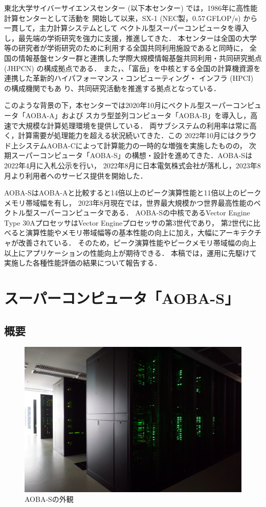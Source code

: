 ﻿\documentclass[submit,techrep,noauthor]{ipsj}
\begin{document}
東北大学サイバーサイエンスセンター (以下本センター) では，1986年に高性能計算センターとして活動を
開始して以来，SX-1 (NEC製，0.57\,GFLOP/s) から一貫して，主力計算システムとして
ベクトル型スーパーコンピュータを導入し，最先端の学術研究を強力に支援，推進してきた．
本センターは全国の大学等の研究者が学術研究のために利用する全国共同利用施設であると同時に，
全国の情報基盤センター群と連携した学際大規模情報基盤共同利用・共同研究拠点 (JHPCN) の構成拠点である．
また，、「富岳」を中核とする全国の計算機資源を連携した革新的ハイパフォーマンス・コンピューティング・
インフラ (HPCI) の構成機関でもあ り、共同研究活動を推進する拠点となっている．

このような背景の下，本センターでは2020年10月にベクトル型スーパーコンピュータ「AOBA-A」および
スカラ型並列コンピュータ「AOBA-B」を導入し，高速で大規模な計算処理環境を提供している．
両サブシステムの利用率は常に高く，計算需要が処理能力を超える状況続いてきた．この
2022年10月にはクラウド上システムAOBA-Cによって計算能力の一時的な増強を実施したものの，
次期スーパーコンピュータ「AOBA-S」の構想・設計を進めてきた．AOBA-Sは2022年4月に入札公示を行い，
2022年8月に日本電気株式会社が落札し，2023年8月より利用者へのサービス提供を開始した．

AOBA-SはAOBA-Aと比較すると14倍以上のピーク演算性能と11倍以上のピークメモリ帯域幅を有し，
2023年8月現在では，世界最大規模かつ世界最高性能のベクトル型スーパーコンピュータである．
AOBA-Sの中核であるVector Engine Type 30AプロセッサはVector Engineプロセッサの第3世代であり，
第2世代に比べると演算性能やメモリ帯域幅等の基本性能の向上に加え，大幅にアーキテクチャが改善されている．
そのため，ピーク演算性能やピークメモリ帯域幅の向上以上にアプリケーションの性能向上が期待できる．
本稿では，運用に先駆けて実施した各種性能評価の結果について報告する．

\section{スーパーコンピュータ「AOBA-S」}

\subsection{概要}

\begin{figure}[tb]
  \centering
  \includegraphics[width=.9\columnwidth]{figs/rack.jpg}
  \caption{AOBA-Sの外観}\label{fig:aoba-s}
\end{figure}
\end{document}
